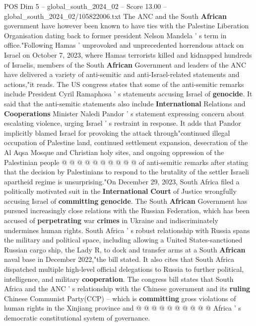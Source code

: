 \begin{textsample}{POS Dim 5 – global\_south\_2024\_02 – Score 13.00 – global\_south\_2024\_02/105822006.txt}
The ANC and the South \textbf{African} government have however been known to have ties with the Palestine Liberation Organisation dating back to former president Nelson Mandela ' s term in office."Following Hamas ' unprovoked and unprecedented horrendous attack on Israel on October 7, 2023, where Hamas terrorists killed and kidnapped hundreds of Israelis, members of the South \textbf{African} Government and leaders of the ANC have delivered a variety of anti-semitic and anti-Israel-related statements and actions,"it reads.
The US congress states that some of the anti-semitic remarks include President Cyril Ramaphosa ' s statements accusing Israel of \textbf{genocide}.
It said that the anti-semitic statements also include \textbf{International} Relations and \textbf{Cooperations} Minister Naledi Pandor ' s statement expressing concern about escalating violence, urging Israel ' s restraint in response.
It adds that Pandor implicitly blamed Israel for provoking the attack through"continued illegal occupation of Palestine land, continued settlement expansion, desecration of the Al Aqsa Mosque and Christian holy sites, and ongoing oppression of the Palestinian people @ @ @ @ @ @ @ @ @ @ of anti-semitic remarks after stating that the decision by Palestinians to respond to the brutality of the settler Israeli apartheid regime is unsurprising."On December 29, 2023, South Africa filed a politically motivated suit in the \textbf{International} \textbf{Court} of Justice wrongfully accusing Israel of \textbf{committing} \textbf{genocide}.
The South \textbf{African} Government has pursued increasingly close relations with the Russian Federation, which has been accused of \textbf{perpetrating} war \textbf{crimes} in Ukraine and indiscriminately undermines human rights.
South Africa ' s robust relationship with Russia spans the military and political space, including allowing a United States-sanctioned Russian cargo ship, the Lady R, to dock and transfer arms at a South \textbf{African} naval base in December 2022,"the bill stated.
It also cites that South Africa dispatched multiple high-level official delegations to Russia to further political, intelligence, and military \textbf{cooperation}.
The congress bill states that South Africa and the ANC ' s relationship with the Chinese government and its \textbf{ruling} Chinese Communist Party(CCP) -- which is \textbf{committing} gross violations of human rights in the Xinjiang province and @ @ @ @ @ @ @ @ @ @ Africa ' s democratic constitutional system of governance.

\end{textsample}

